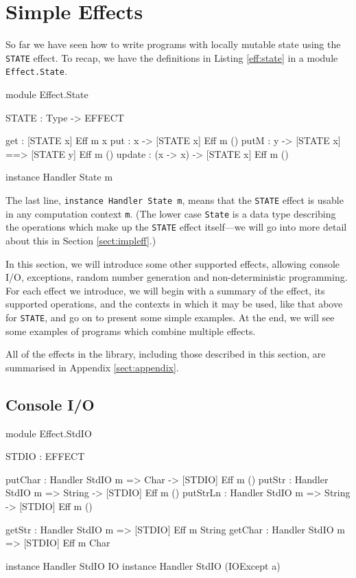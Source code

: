 \section{Simple Effects}

So far we have seen how to write programs with locally mutable state using the
\texttt{STATE} effect. To recap, we have the definitions in
Listing \ref{eff:state} in a module \texttt{Effect.State}.

\begin{code}[float=h,frame=single,caption={State Effect},label=eff:state]
module Effect.State

STATE : Type -> EFFECT

get    :             { [STATE x] } Eff m x
put    : x ->        { [STATE x] } Eff m () 
putM   : y ->        { [STATE x] ==> [STATE y] } Eff m () 
update : (x -> x) -> { [STATE x] } Eff m () 

instance Handler State m
\end{code}

\noindent
The last line, \texttt{instance Handler State m}, means that the \texttt{STATE}
effect is usable in any computation context \texttt{m}. (The lower case
\texttt{State} is a data type describing the operations which make up the
\texttt{STATE} effect itself---we will go into more
detail about this in Section \ref{sect:impleff}.) 

In this section, we will introduce some other supported effects, allowing
console I/O, exceptions, random number generation and non-deterministic
programming.
For each effect we introduce, we will begin with a summary of the effect,
its supported operations, and the contexts in which it may be used,
like that above for \texttt{STATE}, and go on to
present some simple examples. At the end, we will see some examples of programs
which combine multiple effects.

All of the effects in the library, including those described in this section,
are summarised in Appendix \ref{sect:appendix}.

\subsection{Console I/O}

\begin{code}[float=h,frame=single, caption={Console I/O Effect}, label=eff:stdio]
module Effect.StdIO

STDIO : EFFECT

putChar  : Handler StdIO m => Char ->   { [STDIO] } Eff m ()
putStr   : Handler StdIO m => String -> { [STDIO] } Eff m ()
putStrLn : Handler StdIO m => String -> { [STDIO] } Eff m ()

getStr   : Handler StdIO m =>           { [STDIO] } Eff m String
getChar  : Handler StdIO m =>           { [STDIO] } Eff m Char

instance Handler StdIO IO
instance Handler StdIO (IOExcept a)
\end{code}

